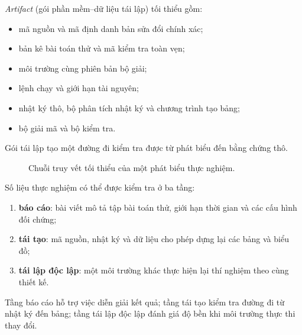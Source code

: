 \emph{Artifact} (gói phần mềm--dữ liệu tái lập) tối thiểu gồm:
\begin{itemize}
  \item mã nguồn và mã định danh bản sửa đổi chính xác;
  \item bản kê bài toán thử và mã kiểm tra toàn vẹn;
  \item môi trường cùng phiên bản bộ giải;
  \item lệnh chạy và giới hạn tài nguyên;
  \item nhật ký thô, bộ phân tích nhật ký và chương trình tạo bảng;
  \item bộ giải mã và bộ kiểm tra.
\end{itemize}
Gói tái lập tạo một đường đi kiểm tra được từ phát biểu đến bằng chứng thô.

\begin{figure}[tb]
\centering
{}
\caption{Chuỗi truy vết tối thiểu của một phát biểu thực nghiệm.}
\label{fig:claim-artifact-chain}
\end{figure}

Số liệu thực nghiệm có thể được kiểm tra ở ba tầng:
\begin{enumerate}
  \item \textbf{báo cáo}: bài viết mô tả tập bài toán thử, giới hạn thời gian
        và các cấu hình đối chứng;
  \item \textbf{tái tạo}: mã nguồn, nhật ký và dữ liệu cho phép dựng lại các
        bảng và biểu đồ;
  \item \textbf{tái lập độc lập}: một môi trường khác thực hiện lại thí
        nghiệm theo cùng thiết kế.
\end{enumerate}
Tầng báo cáo hỗ trợ việc diễn giải kết quả; tầng tái tạo kiểm tra đường đi từ
nhật ký đến bảng; tầng tái lập độc lập đánh giá độ bền khi môi trường thực thi
thay đổi.

